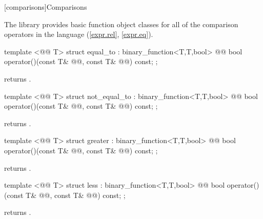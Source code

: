 \documentclass[american,twoside]{book}
\begin{document}
[comparisons]{Comparisons}

\pnum
The library provides basic function object classes for all of the comparison
operators in the language (\ref{expr.rel}, \ref{expr.eq}).

%
\begin{itemdecl}
template <@@ T> struct equal_to : binary_function<T,T,bool> {
  @@
    bool operator()(const T& @@, const T& @@) const;
};
\end{itemdecl}

\begin{itemdescr}
\pnum
{} returns .
\end{itemdescr}

%
\begin{itemdecl}
template <@@ T> struct not_equal_to : binary_function<T,T,bool> {
  @@
    bool operator()(const T& @@, const T& @@) const;
};
\end{itemdecl}

\begin{itemdescr}
\pnum
{} returns .
\end{itemdescr}

%
\begin{itemdecl}
template <@@ T> struct greater : binary_function<T,T,bool> {
  @@
    bool operator()(const T& @@, const T& @@) const;
};
\end{itemdecl}

\begin{itemdescr}
\pnum
{} returns .
\end{itemdescr}

%
\begin{itemdecl}
template <@@ T> struct less : binary_function<T,T,bool> {
  @@
    bool operator()(const T& @@, const T& @@) const;
};
\end{itemdecl}

\begin{itemdescr}
\pnum
{} returns .
\end{itemdescr}
\end{document}
